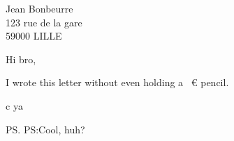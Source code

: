 \documentclass[12pt,a4paper,final]{lettre}
\begin{document}

\begin{letter}{Jean Bonbeurre\\
    123 rue de la gare\\
    59000 LILLE}
\francais

\date{October 21, 2015}

\opening{Hi bro,}

I wrote this letter without even holding a ~€ pencil.

\closing{c ya}

\ps{PS:}{Cool, huh?}


\end{letter}
\end{document}
